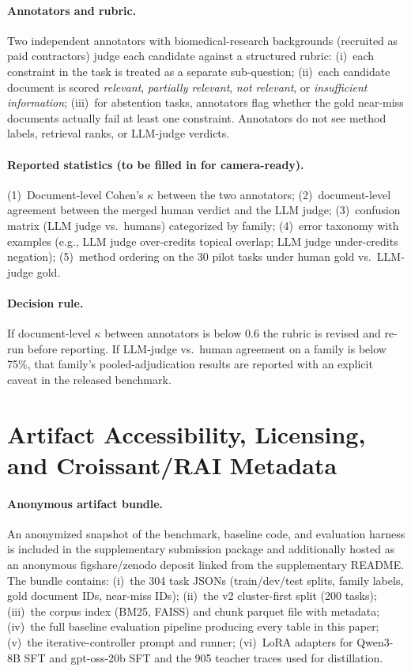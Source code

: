 \documentclass{article}
\begin{document}
\paragraph{Annotators and rubric.} Two independent annotators with biomedical-research backgrounds (recruited as paid contractors) judge each candidate against a structured rubric: (i)~each constraint in the task is treated as a separate sub-question; (ii)~each candidate document is scored \emph{relevant}, \emph{partially relevant}, \emph{not relevant}, or \emph{insufficient information}; (iii)~for abstention tasks, annotators flag whether the gold near-miss documents actually fail at least one constraint. Annotators do not see method labels, retrieval ranks, or LLM-judge verdicts.

\paragraph{Reported statistics (to be filled in for camera-ready).} (1)~Document-level Cohen's $\kappa$ between the two annotators; (2)~document-level agreement between the merged human verdict and the LLM judge; (3)~confusion matrix (LLM judge vs.\ humans) categorized by family; (4)~error taxonomy with examples (e.g., LLM judge over-credits topical overlap; LLM judge under-credits negation); (5)~method ordering on the 30 pilot tasks under human gold vs.\ LLM-judge gold.

\paragraph{Decision rule.} If document-level $\kappa$ between annotators is below 0.6 the rubric is revised and re-run before reporting. If LLM-judge vs.\ human agreement on a family is below 75\%, that family's pooled-adjudication results are reported with an explicit caveat in the released benchmark.

\section{Artifact Accessibility, Licensing, and Croissant/RAI Metadata}
\label{app:artifacts}

\paragraph{Anonymous artifact bundle.} An anonymized snapshot of the benchmark, baseline code, and evaluation harness is included in the supplementary submission package and additionally hosted as an anonymous figshare/zenodo deposit linked from the supplementary README. The bundle contains: (i)~the 304 task JSONs (train/dev/test splits, family labels, gold document IDs, near-miss IDs); (ii)~the v2 cluster-first split (200 tasks); (iii)~the corpus index (BM25, FAISS) and chunk parquet file with metadata; (iv)~the full baseline evaluation pipeline producing every table in this paper; (v)~the iterative-controller prompt and runner; (vi)~LoRA adapters for Qwen3-8B SFT and gpt-oss-20b SFT and the 905 teacher traces used for distillation.
\end{document}
